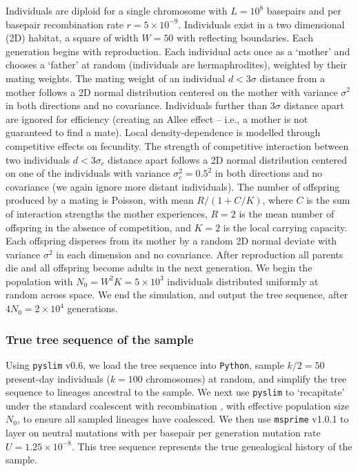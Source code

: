\documentclass[12pt]{article}
\begin{document}
Individuals are diploid for a single chromosome with $L=10^8$ basepairs and per basepair recombination rate $r=5\times10^{-9}$.
Individuals exist in a two dimensional (2D) habitat, a square of width $W=50$ with reflecting boundaries.
Each generation begins with reproduction.
Each individual acts once as a `mother' and chooses a `father' at random (individuals are hermaphrodites), weighted by their mating weights.
The mating weight of an individual $d<3\sigma$ distance from a mother follows a 2D normal distribution centered on the mother with variance $\sigma^2$ in both directions and no covariance.
Individuals further than $3\sigma$ distance apart are ignored for efficiency (creating an Allee effect -- i.e., a mother is not guaranteed to find a mate).
Local density-dependence is modelled through competitive effects on fecundity.
The strength of competitive interaction between two individuals $d<3\sigma_c$ distance apart follows a 2D normal distribution centered on one of the individuals with variance $\sigma_c^2=0.5^2$ in both directions and no covariance (we again ignore more distant individuals).
The number of offspring produced by a mating is Poisson, with mean $R/(1 + C/K)$, where $C$ is the sum of interaction strengths the mother experiences, $R=2$ is the mean number of offspring in the absence of competition, and $K=2$ is the local carrying capacity. 
Each offspring disperses from its mother by a random 2D normal deviate with variance $\sigma^2$ in each dimension and no covariance. 
After reproduction all parents die and all offspring become adults in the next generation.
We begin the population with $N_0=W^2 K = 5\times10^3$ individuals distributed uniformly at random across space.
We end the simulation, and output the tree sequence, after $4N_0=2\times10^4$ generations.

\subsubsection*{True tree sequence of the sample}

Using \texttt{pyslim} v0.6, we load the tree sequence into \texttt{Python}, sample $k/2=50$ present-day individuals ($k=100$ chromosomes) at random, and simplify the tree sequence to lineages ancestral to the sample.
We next use \texttt{pyslim} to `recapitate' under the standard coalescent with recombination \citep{hudson2002generating}, with effective population size $N_0$, to ensure all sampled lineages have coalesced.
We then use \texttt{msprime} v1.0.1 \citep{kelleher2016efficient} to layer on neutral mutations with per basepair per generation mutation rate $U=1.25\times10^{-8}$.
This tree sequence represents the true genealogical history of the sample.
\end{document}
